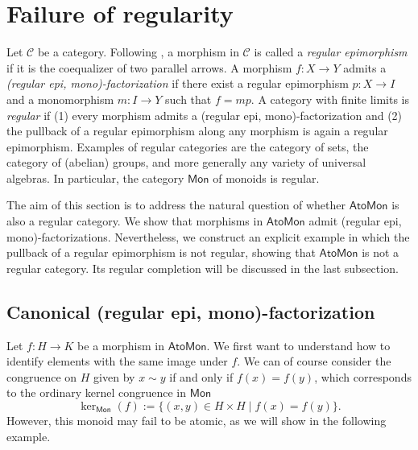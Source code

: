 \documentclass[a4paper,10pt,reqno]{amsart}
\theoremstyle{definition}
\theoremstyle{remark}
\newcommand{\AtoMon}{\mathsf{AtoMon}}
\newcommand{\Mon}{\mathsf{Mon}}
\newcommand{\Cal}[1]{\mathcal{#1}}
\begin{document}
\section{Failure of regularity}\label{sec:regularity}

Let $\Cal C$ be a category. Following \cite{Gran}, a morphism in $\Cal C$ is called a \emph{regular epimorphism} if it is the coequalizer of two parallel arrows. A morphism $f \colon X \to Y$ admits a \emph{(regular epi, mono)-factorization} if there exist a regular epimorphism $p \colon X \to I$ and a monomorphism $m \colon I \to Y$ such that $f=m p$. A category with finite limits is \emph{regular} if (1) every morphism admits a (regular epi, mono)-factorization and (2) the pullback of a regular epimorphism along any morphism is again a regular epimorphism. Examples of regular categories are the category of sets, the category of (abelian) groups, and more generally any variety of universal algebras. In particular, the category $\Mon$ of monoids is regular.

The aim of this section is to address the natural question of whether $\AtoMon$ is also a regular category. We show that morphisms in $\AtoMon$ admit (regular epi, mono)-factorizations. Nevertheless, we construct an explicit example in which the pullback of a regular epimorphism is not regular, showing that $\AtoMon$ is not a regular category. Its regular completion will be discussed in the last subsection.

\medskip

\subsection{Canonical (regular epi, mono)-factorization}\label{subsec:regepimonofact}

Let $f\colon H \to K$ be a morphism in $\AtoMon$. We first want to understand how to identify elements with the same image under $f$. We can of course consider the congruence on $H$ given by $x \sim y$ if and only if $f(x)=f(y)$, which corresponds to the ordinary kernel congruence in $\Mon$
$$
\ker_{\Mon}(f):=\{(x,y) \in H\times H \mid f(x)=f(y)\}.
$$
However, this monoid may fail to be atomic, as we will show in the following example. 
\end{document}
